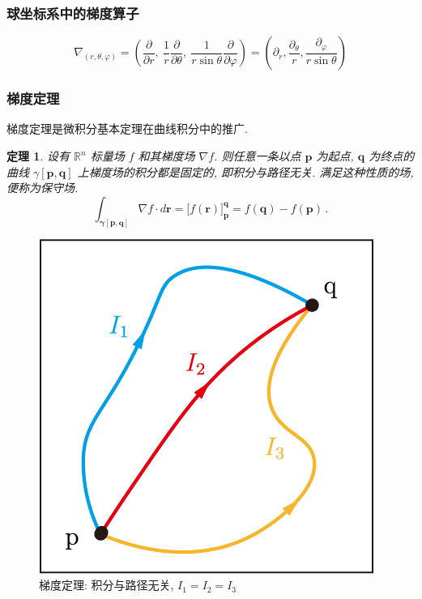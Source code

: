 \documentclass[UTF8]{ctexart}
\newtheorem{theorem}{定理}
\newcommand{\ve}[1]{\boldsymbol{\mathbf{#1}}}
\newcommand{\R}{\mathbb R}
\newcommand{\del}{\nabla}
\begin{document}
\subsubsection{球坐标系中的梯度算子}
\[ \del_{(r, \theta, \varphi)} = \left( \dfrac{\partial}{\partial r},\ \dfrac{1}{r} \dfrac{\partial}{\partial \theta},\ \dfrac{1}{r \sin \theta} \dfrac{\partial}{\partial \varphi} \right) = \left( \partial_r, \dfrac{\partial_\theta}{r}, \dfrac{\partial_\varphi}{r \sin\theta} \right) \]



\subsubsection{梯度定理}
梯度定理是微积分基本定理在曲线积分中的推广. 

\begin{thmbox}
    \begin{theorem}
        设有 $ \R^n $ 标量场 $ f $ 和其梯度场 $ \del f $. 则任意一条以点 $ \ve{p} $ 为起点, $ \ve{q} $ 为终点的曲线 $ \gamma[\ve{p}, \ve{q}] $ 上梯度场的积分都是固定的, 即积分与路径无关. 满足这种性质的场, 便称为保守场.
        \[ \int_{\ve{\gamma}[\ve{p}, \ve{q}]} \del f \cdot d\ve{r} = \big[ f(\ve{r}) \big]_{\ve{p}}^{\ve{q}} = f(\ve{q}) - f(\ve{p})  \,.\]
    \end{theorem} 
\end{thmbox}
\begin{figure}[H]
    \centering
    \includegraphics[width = 0.4\linewidth]{./pic/gradient_thm.png}
    \caption{梯度定理: 积分与路径无关, $ I_1 = I_2 = I_3 $}
\end{figure}
\end{document}
